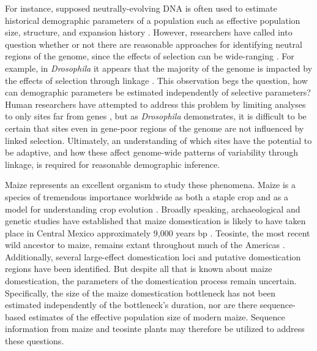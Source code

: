 \documentclass{pnastwo}
\begin{document}
\begin{article}
For instance, supposed neutrally-evolving DNA is often used to estimate historical demographic
parameters of a population such as effective population size, structure, and expansion
history \cite{luikart2003, gutenkunst2009}. However, researchers have
called into question whether or not there are reasonable approaches
for identifying neutral regions of the genome, since the effects of
selection can be wide-ranging \cite{li2012, slotte2014}. For example, in
\emph{Drosophila} it appears that the majority of the genome is
impacted by the effects of selection through linkage
\cite{sella2009}. This observation begs the question, how can
demographic parameters be estimated independently of
selective parameters? Human researchers have attempted to address this
problem by limiting analyses to only sites far from genes
\cite{gazave2014}, but as \emph{Drosophila} demonstrates, it is
difficult to be certain that sites even in gene-poor regions of the
genome are not influenced by linked selection. Ultimately, an understanding
of which sites have the potential to be adaptive, and how these affect
genome-wide patterns of variability through linkage, is required for
reasonable demographic inference.

Maize represents an excellent organism to study these
phenomena. Maize is a species of tremendous importance worldwide as
both a staple crop \cite{SOMETHING} and as a model for
understanding crop evolution \cite{SOMETHINGS}. Broadly speaking, archaeological and genetic studies have
established that maize domestication is likely to have taken place in
Central Mexico approximately 9,000 years bp
\cite{SOMETHING,SOMETHING}. Teosinte, the most
recent wild ancestor to maize, remains extant throughout much of the
Americas \cite{SOMETHING}. Additionally, several large-effect
domestication loci \cite{SOMETHINGS} and putative domestication
regions \cite{hufford2012} have been identified. But despite all that is
known about maize domestication, the parameters of the
domestication process remain uncertain. Specifically, the size of the
maize domestication bottleneck has not been estimated independently of
the bottleneck's duration, nor are there sequence-based estimates of the effective
population size of modern maize. Sequence information from maize and
teosinte plants may therefore be utilized to address these questions.


\end{article}
\end{document}

